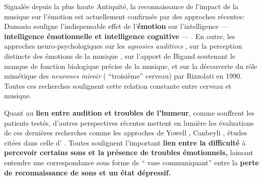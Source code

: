Signalée depuis la plus haute Antiquité,  la reconnaissance de
l'impact de la musique sur l'émotion est actuellement confirmée par
des approches récentes: Damasio
souligne l'indispensable effet de l'\textbf{émotion}
sur l'intelligence   ---     \textbf{intelligence émotionnelle et intelligence
  cognitive} --- \autocite {damasio:lautre}.
En outre, les approches neuro-psychologiques sur les \textit{agnosies
  auditives} \autocite[205--216]{seron.baron.ea:neuropsychologie},
sur la perception distincte des émotions de la musique
\autocite[223--224]{platel_neuropsychology_2002},
sur l'apport de Bigand  \autocite {bigand:cerveau}
soutenant le
manque de fonction biologique précise de la musique,
et sur la
découverte du rôle mimétique des\textit{ neurones miroir }( ``troisième''
cerveau) par Rizzolati \autocite{Rizzolati} en 1990.
Toutes ces recherches soulignent cette relation constante entre cerveau et musique.


Quant au \textbf{ lien entre audition et troubles de l'humeur}, comme souffrent
les patients testés, d'autres perspectives
récentes mettent en lumière les évaluations de ces dernières recherches  comme les approches de Yowell \autocite {Yowell},%
Canbeyli \autocite{Canbeyli},
études citées dans celle d' \autocite {affectiveDisorders}. Toutes soulignent
l'important\textbf{ lien entre la difficulté}
à \textbf {percevoir certains sons et la présence de troubles émotionnels,}
laissant entendre une correspondance sous forme de `` vase communiquant''
entre la \textbf {perte de reconnaissance de
sons et un état dépressif.}

